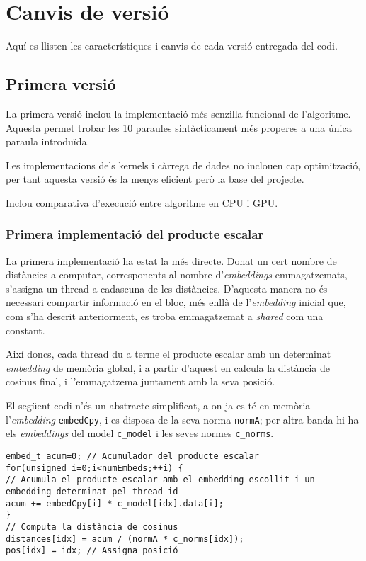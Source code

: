 \documentclass[catalan,10pt,a4paper]{article}
\begin{document}
\section*{Canvis de versió}
Aquí es llisten les característiques i canvis de cada versió entregada del codi.
\subsection*{Primera versió}
La primera versió inclou la implementació més senzilla funcional de l'algoritme. Aquesta permet trobar les 10 paraules sintàcticament més properes a una única paraula introduïda.

Les implementacions dels kernels i càrrega de dades no inclouen cap optimització, per tant aquesta versió és la menys eficient però la base del projecte.

Inclou comparativa d'execució entre algoritme en CPU i GPU.
\subsubsection*{Primera implementació del producte escalar}
La primera implementació ha estat la més directe. Donat un cert nombre de distàncies a computar, corresponents al nombre d'\textit{embeddings} emmagatzemats, s'assigna un thread a cadascuna de les distàncies. D'aquesta manera no és necessari compartir informació en el bloc, més enllà de l'\textit{embedding} inicial que, com s'ha descrit anteriorment, es troba emmagatzemat a \textit{shared} com una constant.

Així doncs, cada thread du a terme el producte escalar amb un determinat \textit{embedding} de memòria global, i a partir d'aquest en calcula la distància de cosinus final, i l'emmagatzema juntament amb la seva posició. 

El següent codi n'és un abstracte simplificat, a on ja es té en memòria l'\textit{embedding} \texttt{embedCpy}, i es disposa de la seva norma \texttt{normA}; per altra banda hi ha els \textit{embeddings} del model \texttt{c_model} i les seves normes \texttt{c_norms}. \newpage
\begin{verbatim}
embed_t acum=0; // Acumulador del producte escalar
for(unsigned i=0;i<numEmbeds;++i) {
// Acumula el producte escalar amb el embedding escollit i un embedding determinat pel thread id
acum += embedCpy[i] * c_model[idx].data[i];
}
// Computa la distància de cosinus
distances[idx] = acum / (normA * c_norms[idx]);
pos[idx] = idx; // Assigna posició
\end{verbatim}
\end{document}
